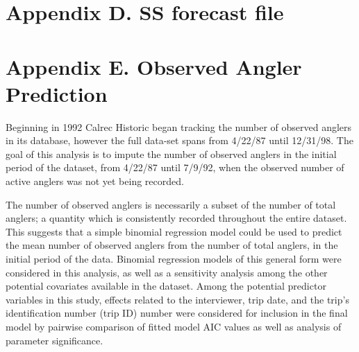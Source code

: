 \documentclass[12pt,]{article}
\begin{document}
\newpage

\section*{Appendix D. SS forecast
file}\label{appendix-d.-ss-forecast-file}

\renewcommand{\thepage}{D-\arabic{page}}
\renewcommand{\thefigure}{D\arabic{figure}}
\renewcommand{\thetable}{D\arabic{table}}

\setcounter{page}{1} \setcounter{figure}{1} \setcounter{table}{1}

\newpage

\section*{Appendix E. Observed Angler
Prediction}\label{appendix-e.-observed-angler-prediction}

\renewcommand{\thepage}{E-\arabic{page}}
\renewcommand{\thefigure}{E\arabic{figure}}
\renewcommand{\thetable}{E\arabic{table}}

\setcounter{page}{1} \setcounter{figure}{1} \setcounter{table}{1}

Beginning in 1992 Calrec Historic began tracking the number of observed
anglers in its database, however the full data-set spans from 4/22/87
until 12/31/98. The goal of this analysis is to impute the number of
observed anglers in the initial period of the dataset, from 4/22/87
until 7/9/92, when the observed number of active anglers was not yet
being recorded.

The number of observed anglers is necessarily a subset of the number of
total anglers; a quantity which is consistently recorded throughout the
entire dataset. This suggests that a simple binomial regression model
could be used to predict the mean number of observed anglers from the
number of total anglers, in the initial period of the data. Binomial
regression models of this general form were considered in this analysis,
as well as a sensitivity analysis among the other potential covariates
available in the dataset. Among the potential predictor variables in
this study, effects related to the interviewer, trip date, and the
trip's identification number (trip ID) number were considered for
inclusion in the final model by pairwise comparison of fitted model AIC
values as well as analysis of parameter significance.
\end{document}

